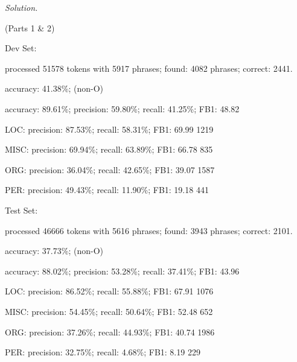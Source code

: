 \documentclass[12pt]{article}
\newcommand\sol[1]{\begin{mdframed}
\emph{Solution.} #1
\end{mdframed}}
\begin{document}
\sol{
\item (Parts 1 \& 2)

\item Dev Set:

\item processed 51578 tokens with 5917 phrases; found: 4082 phrases; correct: 2441.
\item accuracy:  41.38\%; (non-O)
\item accuracy:  89.61\%; precision:  59.80\%; recall:  41.25\%; FB1:  48.82
\item LOC: precision:  87.53\%; recall:  58.31\%; FB1:  69.99  1219
\item MISC: precision:  69.94\%; recall:  63.89\%; FB1:  66.78  835
\item ORG: precision:  36.04\%; recall:  42.65\%; FB1:  39.07  1587
\item PER: precision:  49.43\%; recall:  11.90\%; FB1:  19.18  441

\item 

\item Test Set:
\item processed 46666 tokens with 5616 phrases; found: 3943 phrases; correct: 2101.
\item accuracy:  37.73\%; (non-O)
\item accuracy:  88.02\%; precision:  53.28\%; recall:  37.41\%; FB1:  43.96
\item LOC: precision:  86.52\%; recall:  55.88\%; FB1:  67.91  1076
\item MISC: precision:  54.45\%; recall:  50.64\%; FB1:  52.48  652
\item ORG: precision:  37.26\%; recall:  44.93\%; FB1:  40.74  1986
\item PER: precision:  32.75\%; recall:   4.68\%; FB1:   8.19  229

}
\end{document}
